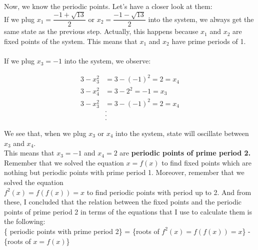 \documentclass[12pt,a4paper, margin=1in]{article}
\begin{document}
\begin{enumerate}
\begin{enumerate}
            Now, we know the periodic points. Let's have a closer look at them: \\

            If we plug  $x_1 = \dfrac{-1 + \sqrt{13}}{2}$ or $x_2 = \dfrac{-1 - \sqrt{13}}{2}$ into the system, we always get the same state as the previous step. Actually, this happens because $x_1$ and $x_2$ are fixed points of the system. This means that $x_1$ and $x_2$ have prime periods of 1.  \\\\

            If we plug $x_3 = -1$ into the system, we observe:
            
            \begin{center}
            \begin{equation*}
            \begin{split}
                    3 - x_3^2 & = 3 - (-1)^2  = 2  = x_4 \\
                    3 - x_4^2 & = 3 - 2^2  = -1  = x_3 \\
                    3 - x_3^2 & = 3 - (-1)^2  = 2  = x_4 \\
                              & . \\
                              & . \\
                              & .
            \end{split}
            \end{equation*}    
            \end{center}

            We see that, when we plug $x_3$ or $x_4$ into the system, state will oscillate between $x_3$ and $x_4$. \\ This means that $x_3 = -1$ and $x_4 = 2$ are \textbf{periodic points of prime period 2.} \\

            Remember that we solved the equation $x = f(x)$ to find fixed points which are nothing but periodic points with prime period 1.  Moreover, remember that we solved the equation \\ $f^2(x) = f(f(x)) = x$ to find periodic points with period up to 2. And from these, I concluded that the relation between the fixed points and the periodic points of prime period 2 in terms of the equations that I use to calculate them is the following: \\

            \{ periodic points with prime period 2\} = \{roots of $f^2(x) = f(f(x)) = x$\} - \{roots of $x = f(x)$\} \\


\end{enumerate}
\end{enumerate}
\end{document}
